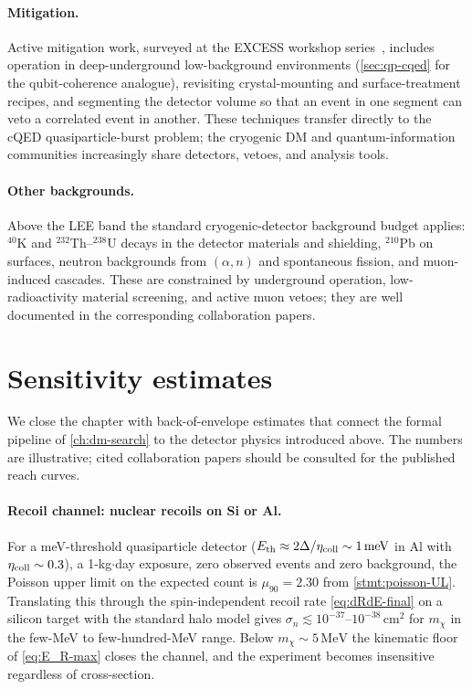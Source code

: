 \paragraph{Mitigation.}
Active mitigation work, surveyed at the EXCESS workshop
series~\cite{adari2022}, includes operation in deep-underground
low-background environments (\cref{sec:qp-cqed} for the
qubit-coherence analogue), revisiting crystal-mounting and
surface-treatment recipes, and segmenting the detector volume so
that an event in one segment can veto a correlated event in
another.  These techniques transfer directly to the cQED
quasiparticle-burst problem; the cryogenic DM and
quantum-information communities increasingly share detectors,
vetoes, and analysis tools.

\paragraph{Other backgrounds.}
Above the LEE band the standard cryogenic-detector background
budget applies: $^{40}$K and $^{232}$Th--$^{238}$U decays in the
detector materials and shielding, $^{210}$Pb on surfaces, neutron
backgrounds from $(\alpha,n)$ and spontaneous fission, and
muon-induced cascades. These are constrained by underground
operation, low-radioactivity material screening, and active
muon vetoes; they are well documented in the corresponding
collaboration papers.

\section{Sensitivity estimates}
\label{sec:qp-sensitivity}

We close the chapter with back-of-envelope estimates that connect
the formal pipeline of \cref{ch:dm-search} to the detector physics
introduced above. The numbers are illustrative; cited collaboration
papers should be consulted for the published reach curves.

\paragraph{Recoil channel: nuclear recoils on Si or Al.}
For a meV-threshold quasiparticle detector
($E_\text{th}\approx 2\Delta/\eta_{\rm coll}\sim 1\,\text{meV}$
in Al with $\eta_{\rm coll}\sim 0.3$), a 1-kg$\cdot$day exposure,
zero observed events and zero background, the Poisson upper
limit on the expected count is $\mu_{90}=2.30$ from
\cref{stmt:poisson-UL}.  Translating this through the
spin-independent recoil rate \cref{eq:dRdE-final} on a silicon
target with the standard halo model gives
$\sigma_n\lesssim 10^{-37}$--$10^{-38}\,\text{cm}^2$ for $m_\chi$
in the few-MeV to few-hundred-MeV range. Below
$m_\chi\sim 5\,\text{MeV}$ the kinematic floor of
\cref{eq:E_R-max} closes the channel, and the experiment becomes
insensitive regardless of cross-section.

